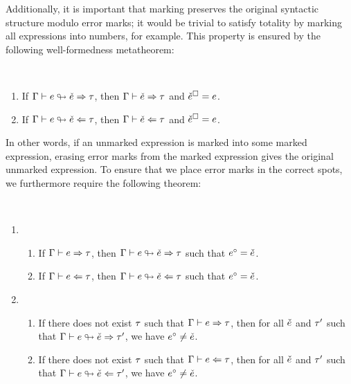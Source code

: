 Additionally, it is important that marking preserves the original syntactic structure modulo error
marks; it would be trivial to satisfy totality by marking all expressions into numbers, for example.
This property is ensured by the following well-formedness metatheorem:
%
\begin{theorem}[name=Marking Well-Formedness] \
  \label{thm:calculus-marking-well-formedness}
  \begin{enumerate}
    \item If $\Gamma \vdash e \looparrowright \check{e} \Rightarrow \tau$, then $\Gamma \vdash \check{e} \Rightarrow \tau$ and
      $\check{e}^{\square} = e$.
    \item If $\Gamma \vdash e \looparrowright \check{e} \Leftarrow \tau$, then $\Gamma \vdash \check{e} \Leftarrow \tau$ and
      $\check{e}^{\square} = e$.
  \end{enumerate}
\end{theorem}
%
In other words, if an unmarked expression is marked into some marked expression, erasing error marks
from the marked expression gives the original unmarked expression. To ensure that we place error
marks in the correct spots, we furthermore require the following theorem:
%
\begin{theorem}[name=Marking of Well-Typed/Ill-Typed Expressions] \ %
  \label{thm:calculus-marking-well-ill-typed}
  \begin{enumerate}
    \item \begin{enumerate}
        \item If $\Gamma \vdash e \Rightarrow \tau$, then $\Gamma \vdash e \looparrowright \check{e} \Rightarrow \tau$
          such that $e^{\circ} = \check{e}$.
        \item If $\Gamma \vdash e \Leftarrow \tau$, then $\Gamma \vdash e \looparrowright \check{e} \Leftarrow \tau$
          such that $e^{\circ} = \check{e}$.
      \end{enumerate}

    \item \begin{enumerate}
        \item If there does not exist $\tau$ such that $\Gamma \vdash e \Rightarrow \tau$, then for all
          $\check{e}$ and $\tau'$ such that $\Gamma \vdash e \looparrowright \check{e} \Rightarrow \tau'$, we have
          $e^{\circ} \neq \check{e}$.
        \item If there does not exist $\tau$ such that $\Gamma \vdash e \Leftarrow \tau$, then for all
          $\check{e}$ and $\tau'$ such that $\Gamma \vdash e \looparrowright \check{e} \Leftarrow \tau'$, we have
          $e^{\circ} \neq \check{e}$.
      \end{enumerate}
  \end{enumerate}
\end{theorem}
